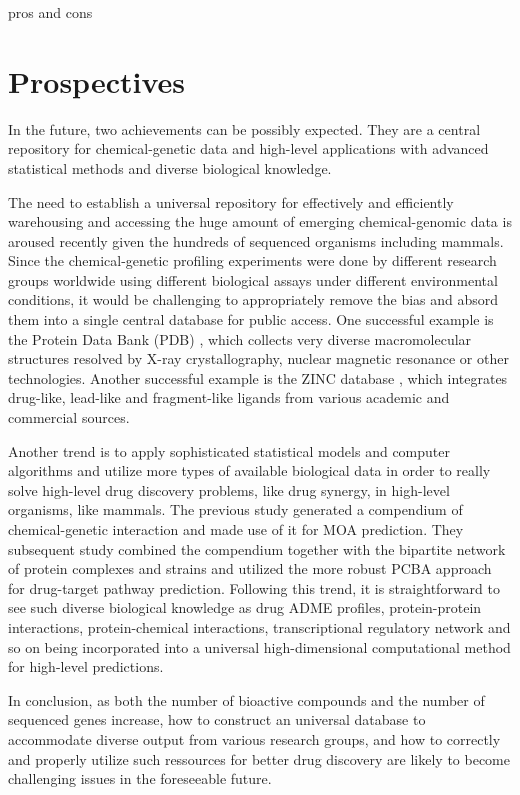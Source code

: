 \documentclass[12pt,fullpage,singlespace]{article}
\begin{document}
pros and cons

\section{Prospectives}

In the future, two achievements can be possibly expected. They are a central repository for chemical-genetic data and high-level applications with advanced statistical methods and diverse biological knowledge.

The need to establish a universal repository for effectively and efficiently warehousing and accessing the huge amount of emerging chemical-genomic data is aroused recently given the hundreds of sequenced organisms including mammals. Since the chemical-genetic profiling experiments were done by different research groups worldwide using different biological assays under different environmental conditions, it would be challenging to appropriately remove the bias and absord them into a single central database for public access. One successful example is the Protein Data Bank (PDB) \citep{105}, which collects very diverse macromolecular structures resolved by X-ray crystallography, nuclear magnetic resonance or other technologies. Another successful example is the ZINC database \citep{532}, which integrates drug-like, lead-like and fragment-like ligands from various academic and commercial sources.

Another trend is to apply sophisticated statistical models and computer algorithms and utilize more types of available biological data in order to really solve high-level drug discovery problems, like drug synergy, in high-level organisms, like mammals. The previous study \citep{1078}  generated a compendium of chemical-genetic interaction and made use of it for MOA prediction. They subsequent study \citep{1079} combined the compendium together with the bipartite network of protein complexes and strains and utilized the more robust PCBA approach for drug-target pathway prediction. Following this trend, it is straightforward to see such diverse biological knowledge as drug ADME profiles, protein-protein interactions, protein-chemical interactions, transcriptional regulatory network and so on being incorporated into a universal high-dimensional computational method for high-level predictions.

In conclusion, as both the number of bioactive compounds and the number of sequenced genes increase, how to construct an universal database to accommodate diverse output from various research groups, and how to correctly and properly utilize such ressources for better drug discovery are likely to become challenging issues in the foreseeable future.



\end{document}
